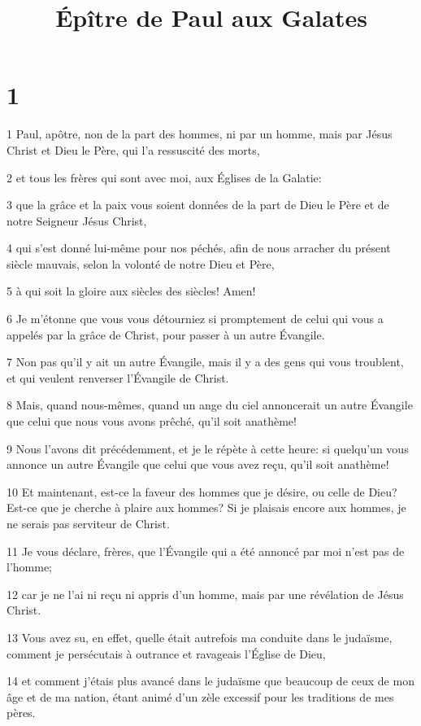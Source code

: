 

\title{Épître de Paul aux Galates}


\chapter{1}

\par 1 Paul, apôtre, non de la part des hommes, ni par un homme, mais par Jésus Christ et Dieu le Père, qui l'a ressuscité des morts,
\par 2 et tous les frères qui sont avec moi, aux Églises de la Galatie:
\par 3 que la grâce et la paix vous soient données de la part de Dieu le Père et de notre Seigneur Jésus Christ,
\par 4 qui s'est donné lui-même pour nos péchés, afin de nous arracher du présent siècle mauvais, selon la volonté de notre Dieu et Père,
\par 5 à qui soit la gloire aux siècles des siècles! Amen!
\par 6 Je m'étonne que vous vous détourniez si promptement de celui qui vous a appelés par la grâce de Christ, pour passer à un autre Évangile.
\par 7 Non pas qu'il y ait un autre Évangile, mais il y a des gens qui vous troublent, et qui veulent renverser l'Évangile de Christ.
\par 8 Mais, quand nous-mêmes, quand un ange du ciel annoncerait un autre Évangile que celui que nous vous avons prêché, qu'il soit anathème!
\par 9 Nous l'avons dit précédemment, et je le répète à cette heure: si quelqu'un vous annonce un autre Évangile que celui que vous avez reçu, qu'il soit anathème!
\par 10 Et maintenant, est-ce la faveur des hommes que je désire, ou celle de Dieu? Est-ce que je cherche à plaire aux hommes? Si je plaisais encore aux hommes, je ne serais pas serviteur de Christ.
\par 11 Je vous déclare, frères, que l'Évangile qui a été annoncé par moi n'est pas de l'homme;
\par 12 car je ne l'ai ni reçu ni appris d'un homme, mais par une révélation de Jésus Christ.
\par 13 Vous avez su, en effet, quelle était autrefois ma conduite dans le judaïsme, comment je persécutais à outrance et ravageais l'Église de Dieu,
\par 14 et comment j'étais plus avancé dans le judaïsme que beaucoup de ceux de mon âge et de ma nation, étant animé d'un zèle excessif pour les traditions de mes pères.
